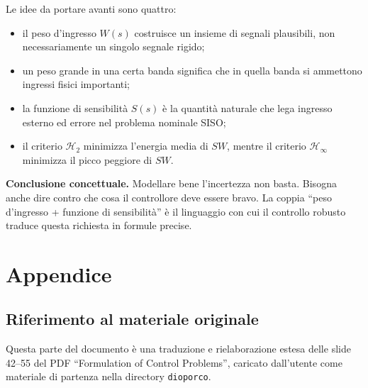 \documentclass[11pt,a4paper]{article}
\begin{document}
Le idee da portare avanti sono quattro:
\begin{itemize}
    \item il peso d'ingresso $W(s)$ costruisce un insieme di segnali plausibili, non necessariamente un singolo segnale rigido;
    \item un peso grande in una certa banda significa che in quella banda si ammettono ingressi fisici importanti;
    \item la funzione di sensibilit\`a $S(s)$ \`e la quantit\`a naturale che lega ingresso esterno ed errore nel problema nominale SISO;
    \item il criterio $\mathcal{H}_2$ minimizza l'energia media di $SW$, mentre il criterio $\mathcal{H}_\infty$ minimizza il picco peggiore di $SW$.
\end{itemize}

\begin{focusbox}
\textbf{Conclusione concettuale.} Modellare bene l'incertezza non basta. Bisogna anche dire contro che cosa il controllore deve essere bravo. La coppia ``peso d'ingresso + funzione di sensibilit\`a'' \`e il linguaggio con cui il controllo robusto traduce questa richiesta in formule precise.
\end{focusbox}

\clearpage
{}
\section*{Appendice}

\subsection*{Riferimento al materiale originale}
{}

Questa parte del documento \`e una traduzione e rielaborazione estesa delle slide 42--55 del PDF ``Formulation of Control Problems'', caricato dall'utente come materiale di partenza nella directory \texttt{dioporco}.
\end{document}

